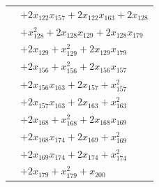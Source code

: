 \begin{longtable}{@{}r@{\;}l@{}}
 & \(\displaystyle +2x_{122}x_{157} +2x_{122}x_{163} +2x_{128}\) \\
 & \(\displaystyle +x_{128}^{2} +2x_{128}x_{129} +2x_{128}x_{179}\) \\
 & \(\displaystyle +2x_{129} +x_{129}^{2} +2x_{129}x_{179}\) \\
 & \(\displaystyle +2x_{156} +x_{156}^{2} +2x_{156}x_{157}\) \\
 & \(\displaystyle +2x_{156}x_{163} +2x_{157} +x_{157}^{2}\) \\
 & \(\displaystyle +2x_{157}x_{163} +2x_{163} +x_{163}^{2}\) \\
 & \(\displaystyle +2x_{168} +x_{168}^{2} +2x_{168}x_{169}\) \\
 & \(\displaystyle +2x_{168}x_{174} +2x_{169} +x_{169}^{2}\) \\
 & \(\displaystyle +2x_{169}x_{174} +2x_{174} +x_{174}^{2}\) \\
 & \(\displaystyle +2x_{179} +x_{179}^{2} +x_{200}\) \\[3pt]
\end{longtable}
\endgroup
